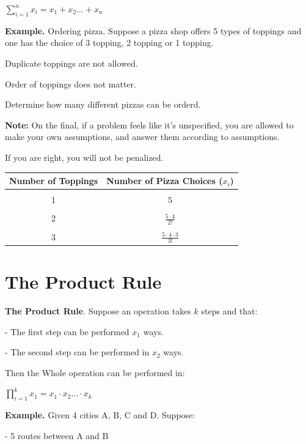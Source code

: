 \documentclass{article}
\begin{document}
\centerline{$\displaystyle\sum_{i = 1}^{n} x_i = x_1 + x_2 \dots + x_n$}

\vspace{0.2cm}

\textbf{Example.} Ordering pizza. Suppose a pizza shop offers 5 types of toppings and one has the choice of 3 topping, 2 topping or 1 topping.

Duplicate toppings are not allowed.

Order of toppings does not matter.

Determine how many different pizzas can be orderd.

\textbf{Note:} On the final, if a problem feels like it's unspecified, you are allowed to make your own assumptions, and answer them according to assumptions.

If you are right, you will not be penalized.

\begin{center}
\begin{tabular}{c|c}
Number of Toppings & Number of Pizza Choices ($x_i$)\\
\hline
&\\
1 & $5$\\
 & \\
2 & $\displaystyle\frac{5 \cdot 4}{2!}$\\
 & \\
3 & $\displaystyle\frac{5 \cdot 4 \cdot 3}{3!}$\\
\end{tabular}
\end{center}

\section{The Product Rule}

\textbf{The Product Rule}. Suppose an operation takes $k$ steps and that:

\quad - The first step can be performed $x_1$ ways.

\quad - The second step can be performed in $x_2$ ways.

Then the Whole operation can be performed in:

\centerline{$\displaystyle\prod_{i = 1}^{k} x_1 = x_1 \cdot x_2 \dots \cdot x_k$}

\vspace{0.2cm}

\textbf{Example.} Given 4 cities A, B, C and D. Suppose:

\quad - 5 routes between A and B
\end{document}

